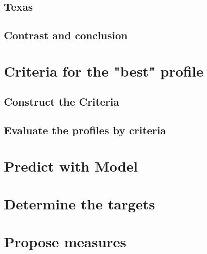\documentclass{mcmthesis}
\begin{document}
\subsection{Texas}
\subsection{Contrast and conclusion}

\section{Criteria for the "best" profile}
\subsection{Construct the Criteria}

\subsection{Evaluate the profiles by criteria }

\section{Predict with Model}
\section{Determine the targets}
\section{Propose measures}
\end{document}
